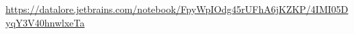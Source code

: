 \documentclass[]{scrartcl}
\begin{document}
\url{https://datalore.jetbrains.com/notebook/FpyWpIOdg45rUFhA6jKZKP/4IMI05DyqY3V40hnwlxeTa}
%
%
%
%
%
%
%
%
%
%
\end{document}
